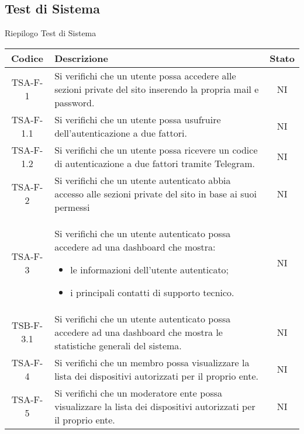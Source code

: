 	\subsection{Test di Sistema}
		\begin{center}
		Riepilogo Test di Sistema
			\begin{longtable}{|c|p{10cm}|c|}
			\hline
			\rowcolor{lighter-grayer}
			\textbf{Codice} & \textbf{Descrizione} & \textbf{Stato}  \\ %

			\hline
			\endhead

	
			\hline
			 TSA-F-1 & Si verifichi che un utente possa accedere alle sezioni private del sito inserendo la propria mail e password.
			  & NI \\
			 \hline
			 TSA-F-1.1 & Si verifichi che un utente possa usufruire dell'autenticazione a due fattori. & NI \\
			 \hline
			 TSA-F-1.2 & Si verifichi che un utente possa ricevere un codice di autenticazione a due fattori tramite Telegram. & NI \\
			 \hline
			 TSA-F-2 & Si verifichi che un utente autenticato abbia accesso alle sezioni private del sito in base ai suoi permessi & NI \\
			 \hline
			 TSA-F-3 & Si verifichi che un utente autenticato possa accedere ad una dashboard che mostra:
			 \begin{itemize}
			 	\item le informazioni dell'utente autenticato;
			 	\item i principali contatti di supporto tecnico.
			 \end{itemize} & NI \\
			 \hline
			 TSB-F-3.1 & Si verifichi che un utente autenticato possa accedere ad una dashboard che mostra le statistiche generali del sistema. & NI \\
			 \hline
			 TSA-F-4 & Si verifichi che un membro possa visualizzare la lista dei dispositivi autorizzati per il proprio ente. & NI \\
			 \hline
			 TSA-F-5 & Si verifichi che un moderatore ente possa visualizzare la lista dei dispositivi autorizzati per il proprio ente. & NI \\

\end{longtable}
\end{center}
